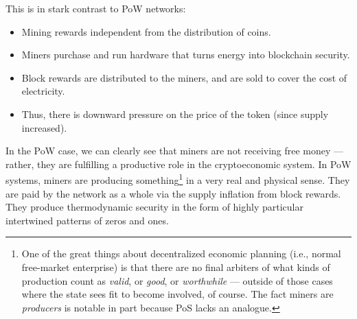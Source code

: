 
This is in stark contrast to PoW networks:
\begin{itemize}
  \renewcommand{\baselinestretch}{1.0}
  \setlength{\itemsep}{-0.25\baselineskip}
  \item Mining rewards independent from the distribution of coins.
  \item Miners purchase and run hardware that turns energy into blockchain security.
  \item Block rewards are distributed to the miners, and are sold\footnotemark{} to cover the cost of electricity.
  \item Thus, there is downward pressure on the price of the token (since supply increased).
\end{itemize}


In the PoW case, we can clearly see that miners are not receiving free money --- rather, they are fulfilling a productive role in the cryptoeconomic system.
In PoW systems, miners are producing something\footnote{
  One of the great things about decentralized economic planning (i.e., normal free-market enterprise) is that there are no final arbiters of what kinds of production count as \emph{valid}, or \emph{good}, or \emph{worthwhile} --- outside of those cases where the state sees fit to become involved, of course.
  The fact miners are \emph{producers} is notable in part because PoS lacks an analogue.
} in a very real and physical sense.
They are paid by the network as a whole via the supply inflation from block rewards.
They produce thermodynamic security in the form of highly particular intertwined patterns of zeros and ones.

